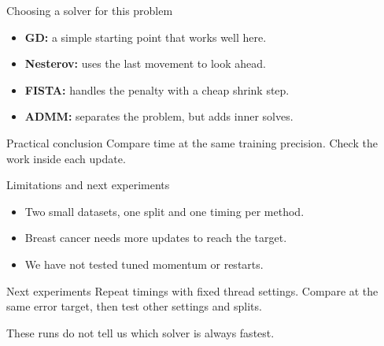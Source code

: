 \documentclass[10pt,aspectratio=169]{beamer}
\begin{document}
\begin{frame}{Choosing a solver for this problem}
\begin{itemize}
  \item \textbf{GD:} a simple starting point that works well here.
  \item \textbf{Nesterov:} uses the last movement to look ahead.
  \item \textbf{FISTA:} handles the penalty with a cheap shrink step.
  \item \textbf{ADMM:} separates the problem, but adds inner solves.
\end{itemize}
\begin{block}{Practical conclusion}
Compare time at the same training precision.
Check the work inside each update.
\end{block}
\end{frame}

\begin{frame}{Limitations and next experiments}
\begin{itemize}
  \item Two small datasets, one split and one timing per method.
  \item Breast cancer needs more updates to reach the target.
  \item We have not tested tuned momentum or restarts.
\end{itemize}
\begin{block}{Next experiments}
Repeat timings with fixed thread settings.
Compare at the same error target, then test other settings and splits.
\end{block}
These runs do not tell us which solver is always fastest.
\end{frame}
\end{document}
